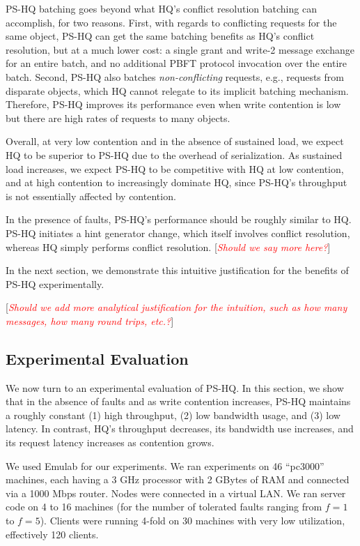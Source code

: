 \documentclass[twocolumn,10pt]{article}
\newcommand{\note}[1]{[\textcolor{red}{\textit{#1}}]}
\begin{document}
PS-HQ batching goes beyond what HQ's conflict resolution batching can
accomplish, for two reasons. First, with regards to conflicting requests
for the same object, PS-HQ can get the same batching benefits as HQ's
conflict resolution, but at a much lower cost: a single grant and
write-2 message exchange for an entire batch, and no additional PBFT
protocol invocation over the entire batch.  Second, PS-HQ also batches
\emph{non-conflicting} requests, e.g., requests from disparate objects,
which HQ cannot relegate to its implicit batching mechanism.  Therefore,
PS-HQ improves its performance even when write contention is low but
there are high rates of requests to many objects.

Overall, at very low contention and in the absence of sustained load,
we expect HQ to be superior to PS-HQ due to the overhead of
serialization.   As sustained load increases, we expect PS-HQ
to be competitive with HQ at low contention, and at high contention
to increasingly dominate HQ, since PS-HQ's throughput is not
essentially affected by contention. 

In the presence of faults, PS-HQ's performance should be roughly
similar to HQ.  PS-HQ initiates a hint generator change, which itself
involves conflict resolution, whereas HQ simply performs conflict
resolution.  \note{Should we say more here?}

In the next section, we demonstrate this intuitive justification for the
benefits of PS-HQ experimentally.

\note{Should we add more analytical justification for the intuition,
  such as how many messages, how many round trips, etc.?}

\subsection{Experimental Evaluation}
\label{sec:eval:pshq}

We now turn to an experimental evaluation of PS-HQ.  In this section, we
show that in the absence of faults and as write contention increases,
PS-HQ maintains a roughly constant (1) high throughput, (2) low bandwidth usage,
and (3) low latency.  In contrast, HQ's throughput decreases, its
bandwidth use increases, and its request latency increases as contention
grows.

We used Emulab for our experiments. We ran experiments on 46 ``pc3000''
machines, each having a 3 GHz processor with 2 GBytes of RAM and
connected via a 1000 Mbps router. Nodes were connected in a virtual LAN.
We ran server code on 4 to 16 machines (for the number of tolerated
faults ranging from $f=1$ to $f=5$). Clients were running 4-fold on 30
machines with very low utilization, effectively 120 clients.
\end{document}
